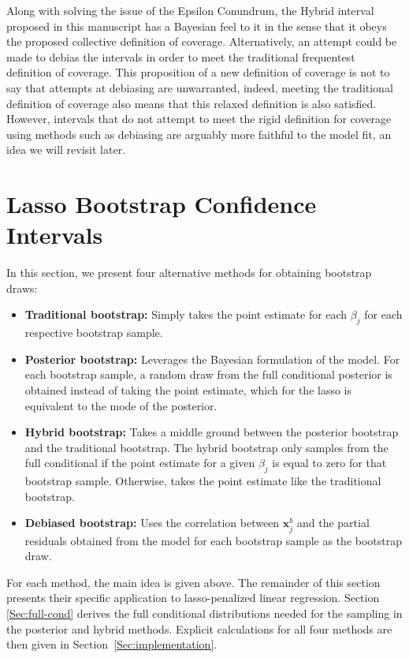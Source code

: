 Along with solving the issue of the Epsilon Conundrum, the Hybrid interval proposed in this manuscript has a Bayesian feel to it in the sense that it obeys the proposed collective definition of coverage. Alternatively, an attempt could be made to debias the intervals in order to meet the traditional frequentest definition of coverage. This proposition of a new definition of coverage is not to say that attempts at debiasing are unwarranted, indeed, meeting the traditional definition of coverage also means that this relaxed definition is also satisfied. However, intervals that do not attempt to meet the rigid definition for coverage using methods such as debiasing are arguably more faithful to the model fit, an idea we will revisit later. 


\section{Lasso Bootstrap Confidence Intervals}


In this section, we present four alternative methods for obtaining bootstrap draws:
\begin{itemize}
\item \textbf{Traditional bootstrap:} Simply takes the point estimate for each $\beta_j$ for each respective bootstrap sample.
\item \textbf{Posterior bootstrap:} Leverages the Bayesian formulation of the model. For each bootstrap sample, a random draw from the full conditional posterior is obtained instead of taking the point estimate, which for the lasso is equivalent to the mode of the posterior.
\item \textbf{Hybrid bootstrap:} Takes a middle ground between the posterior bootstrap and the traditional bootstrap. The hybrid bootstrap only samples from the full conditional if the point estimate for a given $\beta_j$ is equal to zero for that bootstrap sample. Otherwise, takes the point estimate like the traditional bootstrap.
\item \textbf{Debiased bootstrap:} Uses the correlation between $\boldsymbol{x}^b_j$ and the partial residuals obtained from the model for each bootstrap sample as the bootstrap draw.
\end{itemize}

For each method, the main idea is given above. The remainder of this section presents their specific application to lasso-penalized linear regression. Section \ref{Sec:full-cond} derives the full conditional distributions needed for the sampling in the posterior and hybrid methods. Explicit calculations for all four methods are then given in Section~\ref{Sec:implementation}.

